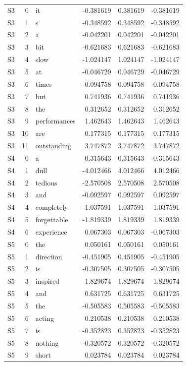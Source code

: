 \begin{longtable}{@{}lrlrrr@{}}
S3 & 0 & it & -0.381619 & 0.381619 & -0.381619 \\
S3 & 1 & s & -0.348592 & 0.348592 & -0.348592 \\
S3 & 2 & a & -0.042201 & 0.042201 & -0.042201 \\
S3 & 3 & bit & -0.621683 & 0.621683 & -0.621683 \\
S3 & 4 & slow & -1.024147 & 1.024147 & -1.024147 \\
S3 & 5 & at & -0.046729 & 0.046729 & -0.046729 \\
S3 & 6 & times & -0.094758 & 0.094758 & -0.094758 \\
S3 & 7 & but & 0.741936 & 0.741936 & 0.741936 \\
S3 & 8 & the & 0.312652 & 0.312652 & 0.312652 \\
S3 & 9 & performances & 1.462643 & 1.462643 & 1.462643 \\
S3 & 10 & are & 0.177315 & 0.177315 & 0.177315 \\
S3 & 11 & outstanding & 3.747872 & 3.747872 & 3.747872 \\
S4 & 0 & a & 0.315643 & 0.315643 & -0.315643 \\
S4 & 1 & dull & -4.012466 & 4.012466 & 4.012466 \\
S4 & 2 & tedious & -2.570508 & 2.570508 & 2.570508 \\
S4 & 3 & and & -0.092597 & 0.092597 & 0.092597 \\
S4 & 4 & completely & -1.037591 & 1.037591 & 1.037591 \\
S4 & 5 & forgettable & -1.819339 & 1.819339 & 1.819339 \\
S4 & 6 & experience & 0.067303 & 0.067303 & -0.067303 \\
S5 & 0 & the & 0.050161 & 0.050161 & 0.050161 \\
S5 & 1 & direction & -0.451905 & 0.451905 & -0.451905 \\
S5 & 2 & is & -0.307505 & 0.307505 & -0.307505 \\
S5 & 3 & inspired & 1.829674 & 1.829674 & 1.829674 \\
S5 & 4 & and & 0.631725 & 0.631725 & 0.631725 \\
S5 & 5 & the & -0.505583 & 0.505583 & -0.505583 \\
S5 & 6 & acting & 0.210538 & 0.210538 & 0.210538 \\
S5 & 7 & is & -0.352823 & 0.352823 & -0.352823 \\
S5 & 8 & nothing & -0.320572 & 0.320572 & -0.320572 \\
S5 & 9 & short & 0.023784 & 0.023784 & 0.023784 \\

\end{longtable}
